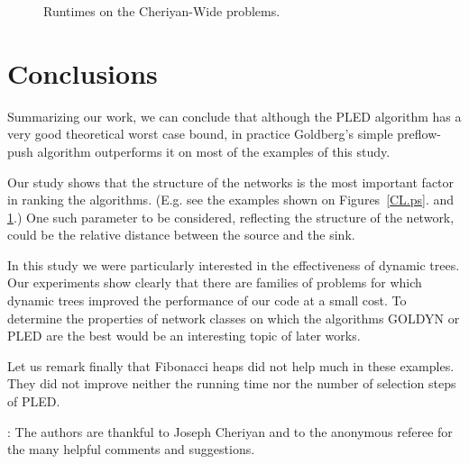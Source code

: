\begin{figure}[h]
\centerline{}
\caption{  Runtimes on the Cheriyan-Wide problems. \label {CW.ps}}
\end{figure}

\clearpage

\section{Conclusions}

Summarizing our work, we can conclude that although the PLED algorithm
has a very good theoretical worst case bound, in practice Goldberg's
simple preflow-push algorithm outperforms it on most of the examples
of this study. 

Our study shows that the structure of the networks is the most
important factor in ranking the algorithms. (E.g. see the examples
shown on Figures~\ref{CL.ps}. and \ref{CW.ps}.) One such parameter
to be considered, reflecting the structure of the network, could be
the relative distance between the source and the sink. 

In this study we were particularly 
interested in the effectiveness of dynamic trees. Our experiments
show clearly that there are families of problems for which dynamic
trees improved the performance of our code at a small cost. To
determine the properties of network classes on 
which the algorithms GOLDYN or PLED are the best would be an
interesting topic of later works.

Let us remark finally that Fibonacci heaps did not help much in these
examples. They did not improve neither the running time nor
the number of selection steps of PLED.

:
The authors are thankful to Joseph Cheriyan and to the anonymous
referee for the many helpful comments and suggestions.



